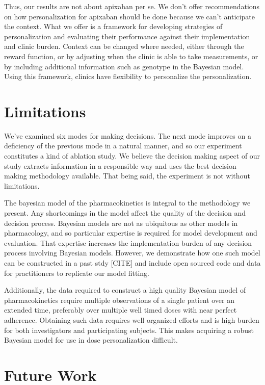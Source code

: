 Thus, our results are not about apixaban per se.  We don’t offer recommendations on how personalization for apixaban should be done because we can’t anticipate the context.  What we offer is a framework for developing strategies of personalization and evaluating their performance against their implementation and clinic burden.  Context can be changed where needed, either through the reward function, or by adjusting when the clinic is able to take measurements, or by including additional information such as genotype in the Bayesian model.  Using this framework, clinics have flexibility to personalize the personalization.


\section{Limitations}

We’ve examined six modes for making decisions.  The next mode improves on a deficiency of the previous mode in a natural manner, and so our experiment constitutes a kind of ablation study.  We believe the decision making aspect of our study extracts information in a responsible way and uses the best decision making methodology available.  That being said, the experiment is not without limitations.

The bayesian model of the pharmacokinetics is integral to the methodology we present.  Any shortcomings in the model affect the quality of the decision and decision process.  Bayesian models are not as ubiquitous as other models in pharmacology, and so particular expertise is required for model development and evaluation.  That expertise increases the implementation burden of any decision process involving Bayesian models.  However, we demonstrate how one such model can be constructed in a past stdy [CITE] and include open sourced code and data for practitioners to replicate our model fitting.

Additionally, the data required to construct a high quality Bayesian model of pharmacokinetics require multiple observations of a single patient over an extended time, preferably over multiple well timed doses with near perfect adherence.  Obtaining such data requires well organized efforts and is high burden for both investigators and participating subjects.  This makes acquiring a robust Bayesian model for use in dose personalization difficult.

\section{Future Work}

